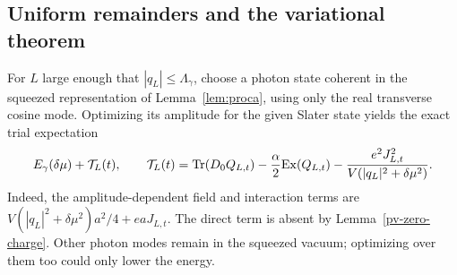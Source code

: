 \subsection{Uniform remainders and the variational theorem}

For \(L\) large enough that \(|q_L|\leq\Lambda_\gamma\), choose a photon
state coherent in the squeezed representation of Lemma~\ref{lem:proca},
using only the real transverse cosine mode. Optimizing its amplitude for
the given Slater state yields the exact trial expectation
\begin{equation}
 E_\gamma(\delta\mu)+\mathcal T_L(t),\qquad
 \mathcal T_L(t)=\operatorname{Tr}(D_0Q_{L,t})
       -\frac\alpha2\mathrm{Ex}(Q_{L,t})
       -\frac{e^2J_{L,t}^2}{V(|q_L|^2+\delta\mu^2)}.
 \label{pv-trial-energy}
\end{equation}
Indeed, the amplitude-dependent field and interaction terms are
\(V(|q_L|^2+\delta\mu^2)a^2/4+eaJ_{L,t}\). The direct term is absent
by Lemma~\ref{pv-zero-charge}. Other photon modes remain in the squeezed
vacuum; optimizing over them too could only lower the energy.

